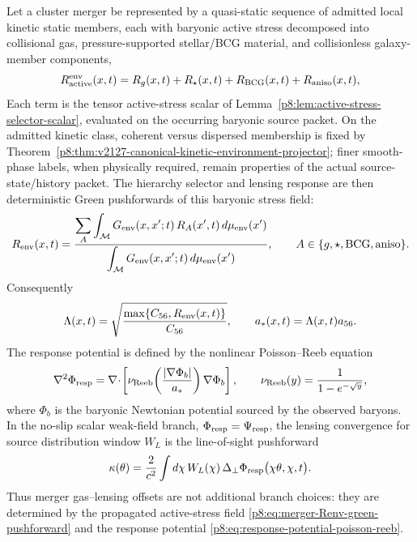 \documentclass[12pt,a4paper]{article}
\begin{document}
\begin{theorem}
\label{p8:thm:merger-lensing-green-propagation}
Let a cluster merger be represented by a quasi-static sequence of admitted local kinetic static members, each with baryonic active stress decomposed into collisional gas, pressure-supported stellar/BCG material, and collisionless galaxy-member components,
\begin{equation}
\label{p8:eq:merger-active-stress-decomposition}
    R_{\rm active}^{\rm env}(x,t)
    =R_g(x,t)+R_\star(x,t)+R_{\rm BCG}(x,t)+R_{\rm aniso}(x,t),
\end{equation}
Each term is the tensor active-stress scalar of Lemma~\ref{p8:lem:active-stress-selector-scalar}, evaluated on the occurring baryonic source packet.  On the admitted kinetic class, coherent versus dispersed membership is fixed by Theorem~\ref{p8:thm:v2127-canonical-kinetic-environment-projector}; finer smooth-phase labels, when physically required, remain properties of the actual source-state/history packet.  The hierarchy selector and lensing response are then deterministic Green pushforwards of this baryonic stress field:
\begin{equation}
\label{p8:eq:merger-Renv-green-pushforward}
    R_{\rm env}(x,t)
    =
    \frac{
        \displaystyle\sum_A\int_{\mathcal M}
        G_{\rm env}(x,x';t)\,R_A(x',t)\,d\mu_{\rm env}(x')
    }{
        \displaystyle\int_{\mathcal M}
        G_{\rm env}(x,x';t)\,d\mu_{\rm env}(x')
    },
    \qquad
    A\in\{g,\star,{\rm BCG},{\rm aniso}\}.
\end{equation}
Consequently
\begin{equation}
\label{p8:eq:merger-Lambda-green-pushforward}
    \Lambda(x,t)=
    \sqrt{\frac{\max\{C_{56},R_{\rm env}(x,t)\}}{C_{56}}},
    \qquad
    a_*(x,t)=\Lambda(x,t)a_{56}.
\end{equation}
The response potential is defined by the nonlinear Poisson--Reeb equation
\begin{equation}
\label{p8:eq:response-potential-poisson-reeb}
    \nabla^2\Phi_{\rm resp}
    =
    \nabla\!\cdot\!
    \left[
        \nu_{\rm Reeb}\!\left(\frac{|\nabla\Phi_b|}{a_*}\right)
        \nabla\Phi_b
    \right],
    \qquad
    \nu_{\rm Reeb}(y)=\frac{1}{1-e^{-\sqrt y}},
\end{equation}
where \(\Phi_b\) is the baryonic Newtonian potential sourced by the observed baryons.  In the no-slip scalar weak-field branch, \(\Phi_{\rm resp}=\Psi_{\rm resp}\), the lensing convergence for source distribution window \(W_L\) is the line-of-sight pushforward
\begin{equation}
\label{p8:eq:merger-lensing-convergence-map}
    \kappa(\theta)
    =
    \frac{2}{c^2}
    \int d\chi\,W_L(\chi)\,
    \Delta_\perp\Phi_{\rm resp}\big(\chi\theta,\chi,t\big).
\end{equation}
Thus merger gas--lensing offsets are not additional branch choices: they are determined by the propagated active-stress field \eqref{p8:eq:merger-Renv-green-pushforward} and the response potential \eqref{p8:eq:response-potential-poisson-reeb}.
\end{theorem}
\end{document}
